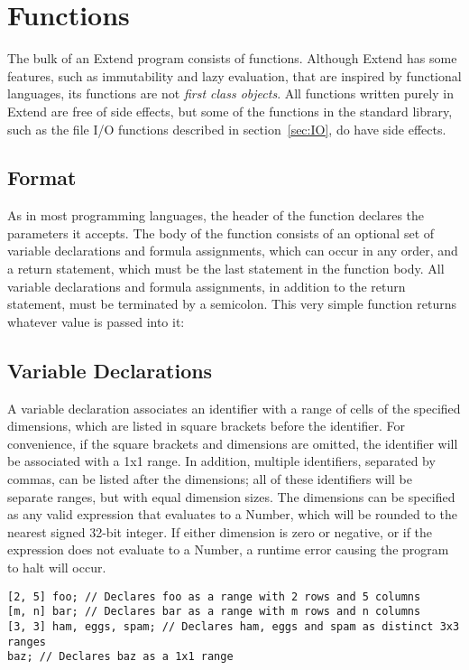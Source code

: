 \section{Functions}
\label{sec:Functions}
The bulk of an Extend program consists of functions. Although Extend has some features, such as immutability and lazy evaluation, that are inspired by functional languages, its functions are not \textit{first class objects}. All functions written purely in Extend are free of side effects, but some of the functions in the standard library, such as the file I/O functions described in section~\ref{sec:IO}, do have side effects.
\subsection{Format}
\label{sec:funcdecl}
As in most programming languages, the header of the function declares the parameters it accepts. The body of the function consists of an optional set of variable declarations and formula assignments, which can occur in any order, and a return statement, which must be the last statement in the function body. All variable declarations and formula assignments, in addition to the return statement, must be terminated by a semicolon.
This very simple function returns whatever value is passed into it:

\subsection{Variable Declarations}
\label{sec:vardecl}
A variable declaration associates an identifier with a range of cells of the specified dimensions, which are listed in square brackets before the identifier. For convenience, if the square brackets and dimensions are omitted, the identifier will be associated with a 1x1 range. In addition, multiple identifiers, separated by commas, can be listed after the dimensions; all of these identifiers will be separate ranges, but with equal dimension sizes. The dimensions can be specified as any valid expression that evaluates to a Number, which will be rounded to the nearest signed 32-bit integer. If either dimension is zero or negative, or if the expression does not evaluate to a Number, a runtime error causing the program to halt will occur.
\begin{lstlisting}
[2, 5] foo; // Declares foo as a range with 2 rows and 5 columns
[m, n] bar; // Declares bar as a range with m rows and n columns
[3, 3] ham, eggs, spam; // Declares ham, eggs and spam as distinct 3x3 ranges
baz; // Declares baz as a 1x1 range
\end{lstlisting}
